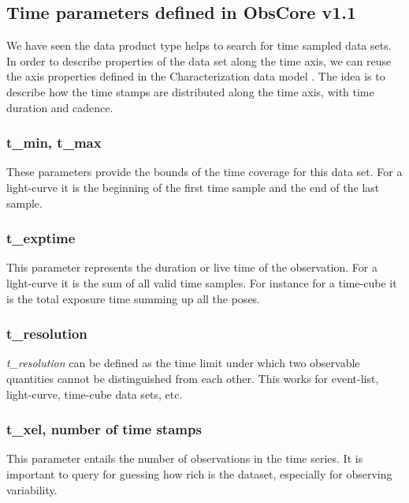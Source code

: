 \documentclass[11pt,a4paper]{ivoa}
\begin{document}
 \subsection{Time parameters defined in ObsCore v1.1}
 \label{sec:alreadythere}
 We have seen the data product type helps to search for time sampled data sets.
 In order to describe properties of the data set along the time axis, we can reuse the axis properties defined in the Characterization data model \citep{2008ivoa.spec.0325L}.
 The idea is to describe how the time stamps are distributed along the time axis, with time duration and  cadence.
 \subsubsection{t\_min, t\_max}
 These parameters provide the bounds of the time coverage for this data set. For a light-curve it is the beginning of the first time sample and the end of the last sample.
  \subsubsection{t\_exptime}
  This parameter represents the duration or live time of the observation.
  For a light-curve it is the sum of all valid time samples. For instance for a time-cube it is the total exposure time summing up all the poses.
  \subsubsection{t\_resolution}
  \emph{t\_resolution} can be defined as the time limit under which two observable quantities cannot be distinguished from each other.
  This works for event-list, light-curve, time-cube data sets, etc.
  \subsubsection{t\_xel, number of time stamps}
This parameter entails the number of observations in the time series. It is important to query for guessing how rich is the dataset, especially for observing variability.


\end{document}
